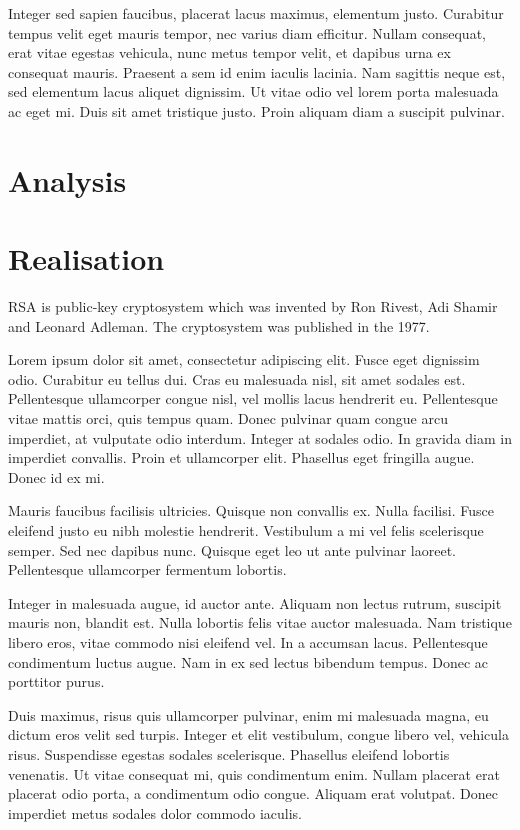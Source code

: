 \documentclass[thesis=B,english]{FITthesis}[2012/10/20]
\begin{document}
Integer sed sapien faucibus, placerat lacus maximus, elementum justo. Curabitur tempus velit eget mauris tempor, nec varius diam efficitur. Nullam consequat, erat vitae egestas vehicula, nunc metus tempor velit, et dapibus urna ex consequat mauris. Praesent a sem id enim iaculis lacinia. Nam sagittis neque est, sed elementum lacus aliquet dignissim. Ut vitae odio vel lorem porta malesuada ac eget mi. Duis sit amet tristique justo. Proin aliquam diam a suscipit pulvinar.


\chapter{Analysis}

\chapter{Realisation}
RSA is public-key cryptosystem which was invented by Ron Rivest, Adi Shamir and Leonard Adleman. The cryptosystem was published in the 1977.

Lorem ipsum dolor sit amet, consectetur adipiscing elit. Fusce eget dignissim odio. Curabitur eu tellus dui. Cras eu malesuada nisl, sit amet sodales est. Pellentesque ullamcorper congue nisl, vel mollis lacus hendrerit eu. Pellentesque vitae mattis orci, quis tempus quam. Donec pulvinar quam congue arcu imperdiet, at vulputate odio interdum. Integer at sodales odio. In gravida diam in imperdiet convallis. Proin et ullamcorper elit. Phasellus eget fringilla augue. Donec id ex mi.

Mauris faucibus facilisis ultricies. Quisque non convallis ex. Nulla facilisi. Fusce eleifend justo eu nibh molestie hendrerit. Vestibulum a mi vel felis scelerisque semper. Sed nec dapibus nunc. Quisque eget leo ut ante pulvinar laoreet. Pellentesque ullamcorper fermentum lobortis.

Integer in malesuada augue, id auctor ante. Aliquam non lectus rutrum, suscipit mauris non, blandit est. Nulla lobortis felis vitae auctor malesuada. Nam tristique libero eros, vitae commodo nisi eleifend vel. In a accumsan lacus. Pellentesque condimentum luctus augue. Nam in ex sed lectus bibendum tempus. Donec ac porttitor purus.

Duis maximus, risus quis ullamcorper pulvinar, enim mi malesuada magna, eu dictum eros velit sed turpis. Integer et elit vestibulum, congue libero vel, vehicula risus. Suspendisse egestas sodales scelerisque. Phasellus eleifend lobortis venenatis. Ut vitae consequat mi, quis condimentum enim. Nullam placerat erat placerat odio porta, a condimentum odio congue. Aliquam erat volutpat. Donec imperdiet metus sodales dolor commodo iaculis.
\end{document}
